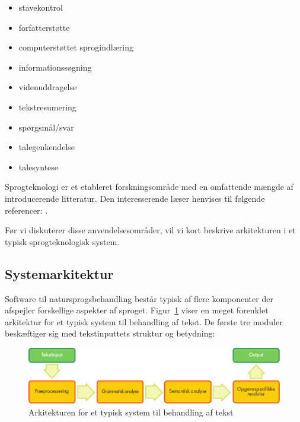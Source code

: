 \begin{multicols}{2}
\begin{itemize}
      \item stavekontrol
      \item forfatterst\o tte
      \item computerst\o ttet sprogindl\ae ring
      \item informationss\o gning
      \item videnuddragelse
      \item tekstresumering
      \item sp\o rgsm\aa l/svar
      \item talegenkendelse
      \item talesyntese
    \end{itemize}
    \sloppy
Sprogteknologi er et etableret forskningsomr\aa de med en omfattende m\ae ngde af introducerende litteratur. Den interesserende l\ae ser henvises til f\o lgende refe\-rencer:  \cite{Braasch, jurafsky-martin01, manning-schuetze1, lt-world1, lt-survey1}.   


 F\o r vi diskuterer disse anvendelses\-omr\aa der, vil vi kort beskrive arkitekturen i et typisk sprogteknologisk system.


\subsection{Systemarkitektur}

 Software til natursprogsbehandling best\aa r typisk af flere komponenter der afspejler forskellige aspekter af sproget.  Figur~\ref{fig:textprocessingarch_de} viser en meget forenklet arkitektur for et typisk system til behandling af tekst. De f\o rste tre mo\-duler besk\ae ftiger sig med tekstinputtets struktur og betydning:

\begin{figure}[htb]
  \center
  \includegraphics[width=\textwidth]{../_media/danish/text_processing_app_architecture}
  \caption{Arkitekturen for et typisk system til behandling af tekst}
  \label{fig:textprocessingarch_de}
\end{figure}


\end{multicols}
